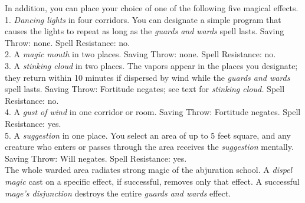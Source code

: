 In addition, you can place your choice of one of the following five magical effects.\\
1. \textit{Dancing lights }in four corridors. You can designate a simple program that causes the lights to repeat as long as the \textit{guards and wards }spell lasts. Saving Throw: none. Spell Resistance: no.\\
2. A \textit{magic mouth }in two places. Saving Throw: none. Spell Resistance: no.\\
3. A \textit{stinking cloud }in two places. The vapors appear in the places you designate; they return within 10 minutes if dispersed by wind while the \textit{guards and wards }spell lasts. Saving Throw: Fortitude negates; see text for \textit{stinking cloud. }Spell Resistance: no.\\
4. A \textit{gust of wind }in one corridor or room. Saving Throw: Fortitude negates. Spell Resistance: yes.\\
5. A \textit{suggestion }in one place. You select an area of up to 5 feet square, and any creature who enters or passes through the area receives the \textit{suggestion }mentally. Saving Throw: Will negates. Spell Resistance: yes.\\
The whole warded area radiates strong magic of the abjuration school. A \textit{dispel magic }cast on a specific effect, if successful, removes only that effect. A successful \textit{mage's disjunction }destroys the entire \textit{guards and wards }effect.\\
